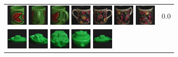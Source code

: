 \begin{figure}[!p]
\begin{center}
\begin{tabular}{m{11cm} | m{3cm} |}
\includegraphics[width=1cm]{coil/beeld-32.eps}
\includegraphics[width=1cm]{coil/beeld-35.eps}
\includegraphics[width=1cm]{coil/beeld-34.eps}
\includegraphics[width=1cm]{coil/beeld-61.eps}
\includegraphics[width=1cm]{coil/beeld-60.eps}
\includegraphics[width=1cm]{coil/beeld-63.eps}
\includegraphics[width=1cm]{coil/beeld-62.eps}
& {\scriptsize 0.0}
\\
\includegraphics[width=1cm]{coil/beeld-54.eps}
\includegraphics[width=1cm]{coil/beeld-58.eps}
\includegraphics[width=1cm]{coil/beeld-59.eps}
\includegraphics[width=1cm]{coil/beeld-56.eps}
\includegraphics[width=1cm]{coil/beeld-55.eps}

\end{tabular}
\end{center}
\end{figure}
